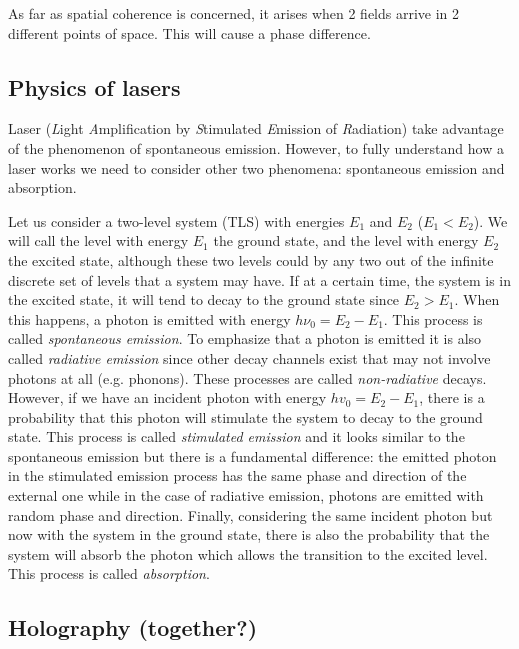 \documentclass[11pt,a4paper]{article}
\begin{document}
As far as spatial coherence is concerned, it arises when 2 fields arrive in 2 different points of space. This will cause a phase difference.

\subsection{Physics of lasers}

Laser (\emph{L}ight \emph{A}mplification by \emph{S}timulated \emph{E}mission of \emph{R}adiation) take advantage of the phenomenon of spontaneous emission. However, to fully understand how a laser works we need to consider other two phenomena: spontaneous emission and absorption.

Let us consider a two-level system (TLS) with energies $E_1$ and $E_2$ ($E_1<E_2$). We will call the level with energy $E_1$ the ground state, and the level with energy $E_2$ the excited state, although these two levels could by any two out of the infinite discrete set of levels that a system may have. If at a certain time, the system is in the excited state, it will tend to decay to the ground state since $E_2>E_1$. When this happens, a photon is emitted with energy $h\nu_0=E_2-E_1$. This process is called \emph{spontaneous emission}. To emphasize that a photon is emitted it is also called \emph{radiative emission} since other decay channels exist that may not involve photons at all (e.g. phonons). These processes are called \emph{non-radiative} decays. However, if we have an incident photon with energy $hv_0=E_2-E_1$, there is a probability that this photon will stimulate the system to decay to the ground state. This process is called \emph{stimulated emission} and it looks similar to the spontaneous emission but there is a fundamental difference: the emitted photon in the stimulated emission process has the same phase and direction of the external one while in the case of radiative emission, photons are emitted with random phase and direction. Finally, considering the same incident photon but now with the system in the ground state, there is also the probability that the system will absorb the photon which allows the transition to the excited level. This process is called \emph{absorption}.



\subsection{Holography (together?)}\label{sec:Holo}
\end{document}
